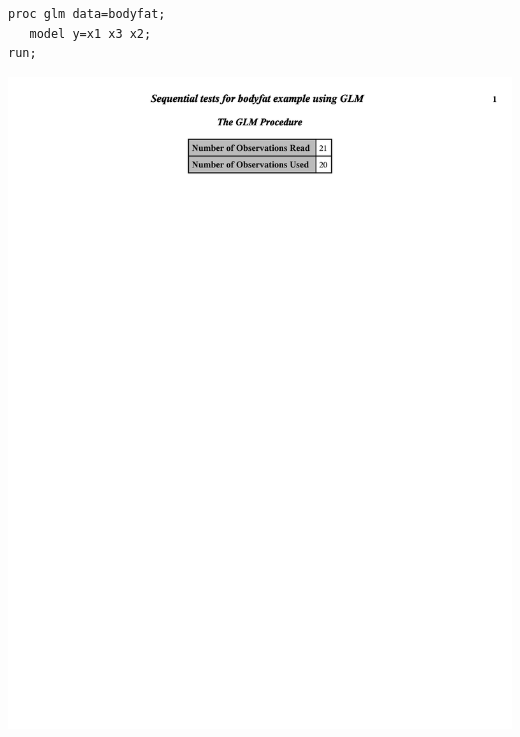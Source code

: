 \documentclass{article}
\begin{document}
\begin{small}
\begin{verbatim}
proc glm data=bodyfat;
   model y=x1 x3 x2;   
run;
\end{verbatim}
\end{small}

\begin{center}
\includegraphics[page=2,scale=0.7,trim= 10mm 70mm 10mm 10mm]{bodyfatexampletypeIglm}
\end{center}
\end{document}
